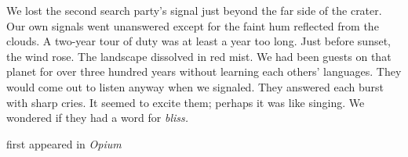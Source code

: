 We lost the second search party's signal just beyond the far side of the
crater. Our own signals went unanswered except for the faint hum
reflected from the clouds. A two-year tour of duty was at least a year
too long. Just before sunset, the wind rose. The landscape dissolved in
red mist. We had been guests on that planet for over three hundred years
without learning each others' languages. They would come out to listen
anyway when we signaled. They answered each burst with sharp cries. It
seemed to excite them; perhaps it was like singing. We wondered if they
had a word for \emph{bliss.}

first appeared in \emph{Opium}
